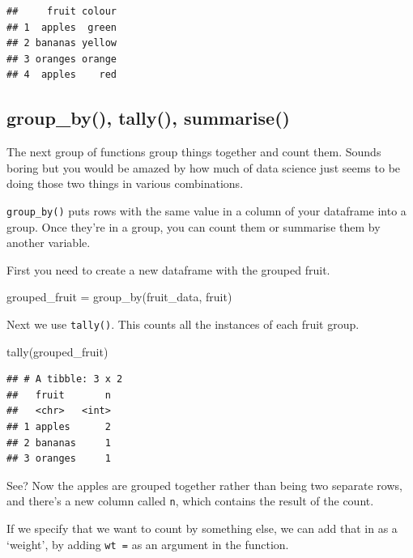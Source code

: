 \documentclass[
]{book}
\newenvironment{Shaded}{\begin{snugshade}}{\end{snugshade}}
\newcommand{\FunctionTok}[1]{\textcolor[rgb]{0.00,0.00,0.00}{#1}}
\newcommand{\NormalTok}[1]{#1}
\newcommand{\OtherTok}[1]{\textcolor[rgb]{0.56,0.35,0.01}{#1}}
\begin{document}
\begin{verbatim}
##     fruit colour
## 1  apples  green
## 2 bananas yellow
## 3 oranges orange
## 4  apples    red
\end{verbatim}

\hypertarget{group_by-tally-summarise}{%
\subsection{group\_by(), tally(), summarise()}\label{group_by-tally-summarise}}

The next group of functions group things together and count them. Sounds boring but you would be amazed by how much of data science just seems to be doing those two things in various combinations.

\texttt{group\_by()} puts rows with the same value in a column of your dataframe into a group. Once they're in a group, you can count them or summarise them by another variable.

First you need to create a new dataframe with the grouped fruit.

\begin{Shaded}
\begin{Highlighting}[]
\NormalTok{grouped\_fruit }\OtherTok{=} \FunctionTok{group\_by}\NormalTok{(fruit\_data, fruit)}
\end{Highlighting}
\end{Shaded}

Next we use \texttt{tally()}. This counts all the instances of each fruit group.

\begin{Shaded}
\begin{Highlighting}[]
\FunctionTok{tally}\NormalTok{(grouped\_fruit)}
\end{Highlighting}
\end{Shaded}

\begin{verbatim}
## # A tibble: 3 x 2
##   fruit       n
##   <chr>   <int>
## 1 apples      2
## 2 bananas     1
## 3 oranges     1
\end{verbatim}

See? Now the apples are grouped together rather than being two separate rows, and there's a new column called \texttt{n}, which contains the result of the count.

If we specify that we want to count by something else, we can add that in as a `weight', by adding \texttt{wt\ =} as an argument in the function.
\end{document}
